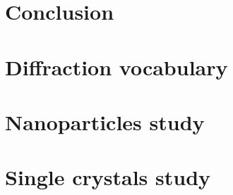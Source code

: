 \documentclass[11pt]{report}
\begin{document}
    \chapter{Conclusion}
    
    
    \printbibliography[
        heading=bibintoc,
        title={Bibliography}
    ]

    \appendix

    \chapter{Diffraction vocabulary}
    

    \chapter{Nanoparticles study}
    
    

    \chapter{Single crystals study}
    
    
    


\end{document}
